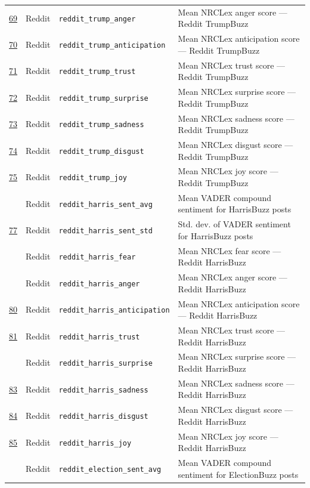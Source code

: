 \begin{longtable}{>{\centering\arraybackslash}p{0.9cm} p{2cm} p{4cm} p{7.5cm}}
\underline{69} & Reddit & \texttt{reddit\_trump\_anger} & Mean NRCLex anger score --- Reddit TrumpBuzz \\
\underline{70} & Reddit & \texttt{reddit\_trump\_anticipation} & Mean NRCLex anticipation score --- Reddit TrumpBuzz \\
\underline{71} & Reddit & \texttt{reddit\_trump\_trust} & Mean NRCLex trust score --- Reddit TrumpBuzz \\
\underline{72} & Reddit & \texttt{reddit\_trump\_surprise} & Mean NRCLex surprise score --- Reddit TrumpBuzz \\
\underline{73} & Reddit & \texttt{reddit\_trump\_sadness} & Mean NRCLex sadness score --- Reddit TrumpBuzz \\
\underline{74} & Reddit & \texttt{reddit\_trump\_disgust} & Mean NRCLex disgust score --- Reddit TrumpBuzz \\
\underline{75} & Reddit & \texttt{reddit\_trump\_joy} & Mean NRCLex joy score --- Reddit TrumpBuzz \\
76 & Reddit & \texttt{reddit\_harris\_sent\_avg} & Mean VADER compound sentiment for HarrisBuzz posts \\
\underline{77} & Reddit & \texttt{reddit\_harris\_sent\_std} & Std. dev. of VADER sentiment for HarrisBuzz posts \\
78 & Reddit & \texttt{reddit\_harris\_fear} & Mean NRCLex fear score --- Reddit HarrisBuzz \\
79 & Reddit & \texttt{reddit\_harris\_anger} & Mean NRCLex anger score --- Reddit HarrisBuzz \\
\underline{80} & Reddit & \texttt{reddit\_harris\_anticipation} & Mean NRCLex anticipation score --- Reddit HarrisBuzz \\
\underline{81} & Reddit & \texttt{reddit\_harris\_trust} & Mean NRCLex trust score --- Reddit HarrisBuzz \\
82 & Reddit & \texttt{reddit\_harris\_surprise} & Mean NRCLex surprise score --- Reddit HarrisBuzz \\
\underline{83} & Reddit & \texttt{reddit\_harris\_sadness} & Mean NRCLex sadness score --- Reddit HarrisBuzz \\
\underline{84} & Reddit & \texttt{reddit\_harris\_disgust} & Mean NRCLex disgust score --- Reddit HarrisBuzz \\
\underline{85} & Reddit & \texttt{reddit\_harris\_joy} & Mean NRCLex joy score --- Reddit HarrisBuzz \\
86 & Reddit & \texttt{reddit\_election\_sent\_avg} & Mean VADER compound sentiment for ElectionBuzz posts \\

\end{longtable}
